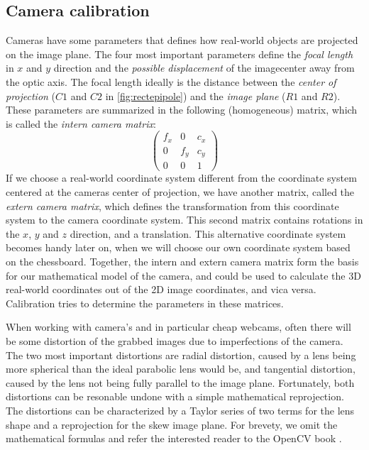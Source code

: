 \documentclass[a4paper]{article}
\begin{document}
\subsection{Camera calibration}
Cameras have some parameters that defines how real-world objects are
projected on the image plane. The four most important parameters define
the \emph{focal length} in $x$ and $y$ direction and the \emph{possible 
displacement} of the imagecenter away from the optic axis. The focal length
ideally is the distance between the \emph{center of projection} ($C1$ and
$C2$ in \ref{fig:rectepipole}) and the \emph{image plane} ($R1$ and $R2$).
These parameters are summarized in the following (homogeneous) matrix,
which is called the \emph{intern camera matrix}:
\[ \left( \begin{array}{ccc}
f_x & 0   & c_x \\
0   & f_y & c_y \\
0   & 0   & 1
\end{array} \right)\] 
If we choose a real-world coordinate system different from the coordinate
system centered at the cameras center of projection, we have another matrix,
called the \emph{extern camera matrix}, which defines the transformation from
this coordinate system to the camera coordinate system. This second matrix
contains rotations in the $x$, $y$ and $z$ direction, and a translation.
This alternative coordinate system becomes handy later on, when we will
choose our own coordinate system based on the chessboard.
Together, the intern and extern camera matrix form the basis for our
mathematical model of the camera, and could be used to calculate the 3D
real-world coordinates out of the 2D image coordinates, and vica versa.
Calibration tries to determine the parameters in these matrices.

When working with camera's and in particular cheap webcams, often there
will be some distortion of the grabbed images due to imperfections of
the camera. The two most important distortions are radial distortion,
caused by a lens being more spherical than the ideal parabolic lens would
be, and tangential distortion, caused by the lens not being fully parallel
to the image plane. Fortunately, both distortions can be resonable undone
with a simple mathematical reprojection. The distortions can be
characterized by a Taylor series of two terms for the lens shape and a
reprojection for the skew image plane. For brevety, we omit the mathematical
formulas and refer the interested reader to the OpenCV book
\cite{LearningOpenCV}.
\end{document}
